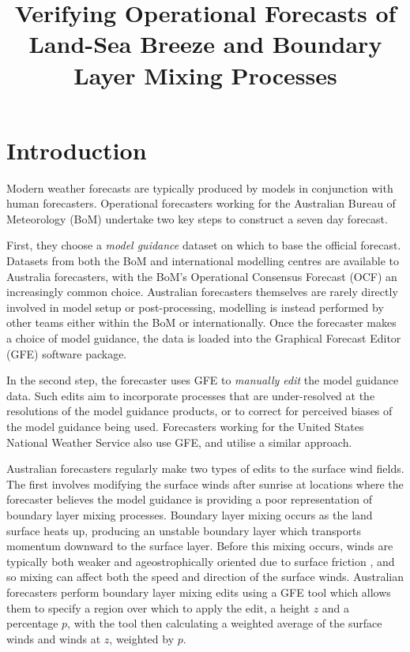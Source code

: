 \documentclass{ametsoc}
\title{Verifying Operational Forecasts of Land-Sea Breeze and Boundary Layer Mixing Processes}
\affiliation{School of Earth Sciences, and ARC Centre of Excellence for Climate Extremes, The University of Melbourne, Melbourne, Victoria, Australia.}
\begin{document}
\maketitle

\section{Introduction}
\label{Sec:Introduction}
Modern weather forecasts are typically produced by models in conjunction with human forecasters. Operational forecasters working for the Australian Bureau of Meteorology (BoM) undertake two key steps to construct a seven day forecast.

First, they choose a \textit{model guidance} dataset on which to base the official forecast. Datasets from both the BoM and international modelling centres are available to Australia forecasters, with the BoM's Operational Consensus Forecast (OCF) an increasingly common choice. Australian forecasters themselves are rarely directly involved in model setup or post-processing, modelling is instead performed by other teams either within the BoM or internationally. Once the forecaster makes a choice of model guidance, the data is loaded into the Graphical Forecast Editor (GFE) software package. 

In the second step, the forecaster uses GFE to \textit{manually edit} the model guidance data. Such edits aim to incorporate processes that are under-resolved at the resolutions of the model guidance products, or to correct for perceived biases of the model guidance being used. Forecasters working for the United States National Weather Service also use GFE, and utilise a similar approach. 

Australian forecasters regularly make two types of edits to the surface wind fields. The first involves modifying the surface winds after sunrise at locations where the forecaster believes the model guidance is providing a poor representation of boundary layer mixing processes. Boundary layer mixing occurs as the land surface heats up, producing an unstable boundary layer which transports momentum downward to the surface layer. Before this mixing occurs, winds are typically both weaker and ageostrophically oriented due to surface friction \citep{lee18}, and so mixing can affect both the speed and direction of the surface winds. Australian forecasters perform boundary layer mixing edits using a GFE tool which allows them to specify a region over which to apply the edit, a height $z$ and a percentage $p$, with the tool then calculating a weighted average of the surface winds and winds at $z$, weighted by $p$.
\end{document}
